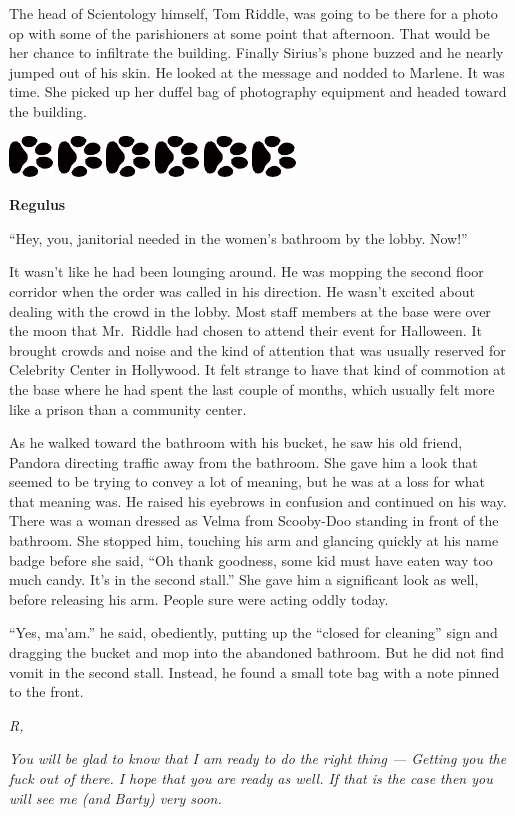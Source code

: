 \documentclass[12pt,twoside,openright]{memoir}
\newcommand{\dogPrintRule}{	
	\begin{center}
		\hspace{.5em}
		\includegraphics[angle=60]{dogprint.pdf}
		\hspace{.5em}
		\includegraphics[angle=120]{dogprint.pdf}
		\hspace{.5em}
		\includegraphics[angle=60]{dogprint.pdf}
		\hspace{.5em}
		\includegraphics[angle=120]{dogprint.pdf}
		\hspace{.5em}
		\includegraphics[angle=60]{dogprint.pdf}
		\hspace{.5em}
		\includegraphics[angle=120]{dogprint.pdf}
		\hspace{.5em}
	\end{center}
}
\begin{document}
The head of Scientology himself, Tom Riddle, was going to be there for a photo op with some of the parishioners at some point that afternoon. That would be her chance to infiltrate the building. Finally Sirius's phone buzzed and he nearly jumped out of his skin. He looked at the message and nodded to Marlene. It was time. She picked up her duffel bag of photography equipment and headed toward the building.

\dogPrintRule

\textbf{Regulus} 

``Hey, you, janitorial needed in the women's bathroom by the lobby. Now!'' 

It wasn't like he had been lounging around. He was mopping the second floor corridor when the order was called in his direction. He wasn't excited about dealing with the crowd in the lobby. Most staff members at the base were over the moon that Mr.\ Riddle had chosen to attend their event for Halloween. It brought crowds and noise and the kind of attention that was usually reserved for Celebrity Center in Hollywood. It felt strange to have that kind of commotion at the base where he had spent the last couple of months, which usually felt more like a prison than a community center.

As he walked toward the bathroom with his bucket, he saw his old friend, Pandora directing traffic away from the bathroom. She gave him a look that seemed to be trying to convey a lot of meaning, but he was at a loss for what that meaning was. He raised his eyebrows in confusion and continued on his way. There was a woman dressed as Velma from Scooby-Doo standing in front of the bathroom. She stopped him, touching his arm and glancing quickly at his name badge before she said, ``Oh thank goodness, some kid must have eaten way too much candy. It's in the second stall.'' She gave him a significant look as well, before releasing his arm. People sure were acting oddly today.

``Yes, ma'am.'' he said, obediently, putting up the ``closed for cleaning'' sign and dragging the bucket and mop into the abandoned bathroom. But he did not find vomit in the second stall. Instead, he found a small tote bag with a note pinned to the front. 

\textit{\newline R,} 

\textit{You will be glad to know that I am ready to do the right thing --- Getting you the fuck out of there. I hope that you are ready as well. If that is the case then you will see me (and Barty) very soon. }
\end{document}
